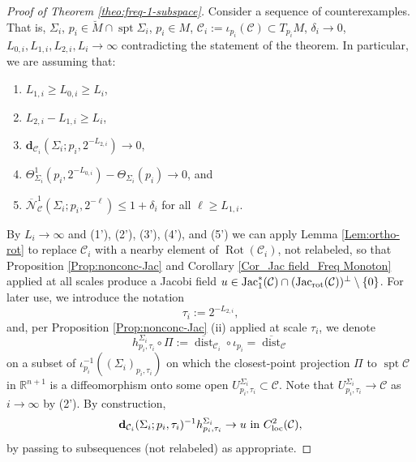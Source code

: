 \documentclass[11pt, letterpaper, reqno]{amsart}
\numberwithin{equation}{section}
\theoremstyle{remark}
\newcommand{\RR}{\mathbb{R}}
\newcommand{\cC}{\mathcal{C}}
\newcommand{\cN}{\mathcal{N}}
\newcommand{\mbfd}{\mathbf{d}}
\newcommand{\spt}{\operatorname{spt}}
\newcommand{\dist}{\operatorname{dist}}
\newcommand{\Jac}{\operatorname{Jac}}
\newcommand{\Sdist}{\overline{\dist}}
\newcommand{\Rot}{\operatorname{Rot}}
\begin{document}
\begin{proof}[Proof of Theorem \ref{theo:freq-1-subspace}]
Consider a sequence of counterexamples. That is, $\Sigma_i$, $p_i \in \breve M \cap \spt \Sigma_i$, $p_i \in M$, $\cC_i := \iota_{p_i}(\cC) \subset T_{p_i}M$, $\delta_i \to 0$, $L_{0,i}, L_{1,i}, L_{2,i}, L_i \to \infty$ contradicting the statement of the theorem. In particular, we are assuming that:
\begin{enumerate}
	\item[(1')] $L_{1,i} \geq L_{0,i} \geq L_i$,
	\item[(2')] $L_{2,i} - L_{1,i} \geq L_i$, 
	\item[(3')] $\mbfd_{\cC_i}(\Sigma_i; p_i, 2^{-L_{2,i}}) \to 0$, 
	\item[(4')] $\Theta^{1}_{\Sigma_i}(p_i, 2^{-L_{0,i}}) - \Theta_{\Sigma_i}(p_i) \to 0$, and
	\item[(5')] $\overline{\cN}^{1}_\cC(\Sigma_i; p_i, 2^{-\ell}) \leq 1 + \delta_i$ for all $\ell \geq L_{1,i}$.
\end{enumerate}
By $L_i \to \infty$ and (1'), (2'), (3'), (4'), and (5') we can apply Lemma \ref{Lem:ortho-rot} to replace $\cC_i$ with a nearby element of $\Rot(\cC_i)$, not relabeled, so that Proposition \ref{Prop:nonconc-Jac} and Corollary \ref{Cor_Jac field_Freq Monoton} applied at all scales produce a Jacobi field $u \in  \Jac_1^*(\cC) \cap (\Jac_\textnormal{rot}(\cC))^\perp \setminus \{ 0 \}$. For later use, we introduce the notation
\[ \tau_i := 2^{-L_{2,i}}, \]
and, per Proposition \ref{Prop:nonconc-Jac} (ii) applied at scale $\tau_i$, we denote
\[ h_{p_i,\tau_i}^{\Sigma_i} \circ \Pi := \Sdist_{\cC_i} \circ \iota_{p_i} = \Sdist_{\cC} \]
on a subset of $\iota_{p_i}^{-1}((\Sigma_i)_{p_i, \tau_i})$ on which the closest-point projection $\Pi$ to $\spt \cC$ in $\RR^{n+1}$ is a diffeomorphism onto some open $U_{p_i, \tau_i}^{\Sigma_i} \subset \cC$. Note that $U_{p_i, \tau_i}^{\Sigma_i} \to \cC$ as $i \to \infty$ by (2'). By construction,
\begin{equation} \label{eq:freq-1-subspace-u0}
	\mbfd_{\cC_i}(\Sigma_i; p_i, \tau_i)^{-1} h^{\Sigma_i}_{p_i, \tau_i} \to u \text{ in } C^2_{\textnormal{loc}}(\cC),
\end{equation}
by passing to subsequences (not relabeled) as appropriate.



\end{proof}
\end{document}
